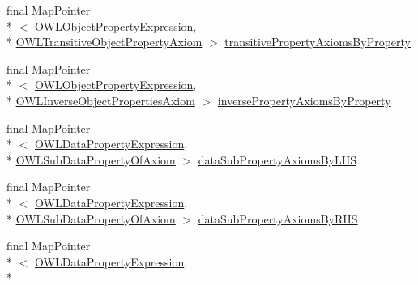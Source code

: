 \begin{DoxyCompactItemize}
\item 
final Map\-Pointer\\*
$<$ \hyperlink{interfaceorg_1_1semanticweb_1_1owlapi_1_1model_1_1_o_w_l_object_property_expression}{O\-W\-L\-Object\-Property\-Expression}, \\*
\hyperlink{interfaceorg_1_1semanticweb_1_1owlapi_1_1model_1_1_o_w_l_transitive_object_property_axiom}{O\-W\-L\-Transitive\-Object\-Property\-Axiom} $>$ \hyperlink{classuk_1_1ac_1_1manchester_1_1cs_1_1owl_1_1owlapi_1_1_abstract_internals_impl_a59538bd3e85bb3fb5433e47ed8e01a1a}{transitive\-Property\-Axioms\-By\-Property}
\item 
final Map\-Pointer\\*
$<$ \hyperlink{interfaceorg_1_1semanticweb_1_1owlapi_1_1model_1_1_o_w_l_object_property_expression}{O\-W\-L\-Object\-Property\-Expression}, \\*
\hyperlink{interfaceorg_1_1semanticweb_1_1owlapi_1_1model_1_1_o_w_l_inverse_object_properties_axiom}{O\-W\-L\-Inverse\-Object\-Properties\-Axiom} $>$ \hyperlink{classuk_1_1ac_1_1manchester_1_1cs_1_1owl_1_1owlapi_1_1_abstract_internals_impl_abda7f39bce3f3c9e953d07882e66e4f6}{inverse\-Property\-Axioms\-By\-Property}
\item 
final Map\-Pointer\\*
$<$ \hyperlink{interfaceorg_1_1semanticweb_1_1owlapi_1_1model_1_1_o_w_l_data_property_expression}{O\-W\-L\-Data\-Property\-Expression}, \\*
\hyperlink{interfaceorg_1_1semanticweb_1_1owlapi_1_1model_1_1_o_w_l_sub_data_property_of_axiom}{O\-W\-L\-Sub\-Data\-Property\-Of\-Axiom} $>$ \hyperlink{classuk_1_1ac_1_1manchester_1_1cs_1_1owl_1_1owlapi_1_1_abstract_internals_impl_a42549876210d85812004b2c82f5daffc}{data\-Sub\-Property\-Axioms\-By\-L\-H\-S}
\item 
final Map\-Pointer\\*
$<$ \hyperlink{interfaceorg_1_1semanticweb_1_1owlapi_1_1model_1_1_o_w_l_data_property_expression}{O\-W\-L\-Data\-Property\-Expression}, \\*
\hyperlink{interfaceorg_1_1semanticweb_1_1owlapi_1_1model_1_1_o_w_l_sub_data_property_of_axiom}{O\-W\-L\-Sub\-Data\-Property\-Of\-Axiom} $>$ \hyperlink{classuk_1_1ac_1_1manchester_1_1cs_1_1owl_1_1owlapi_1_1_abstract_internals_impl_a1db207df97563200224fb431b2f6b70c}{data\-Sub\-Property\-Axioms\-By\-R\-H\-S}
\item 
final Map\-Pointer\\*
$<$ \hyperlink{interfaceorg_1_1semanticweb_1_1owlapi_1_1model_1_1_o_w_l_data_property_expression}{O\-W\-L\-Data\-Property\-Expression}, \\*

\end{DoxyCompactItemize}
